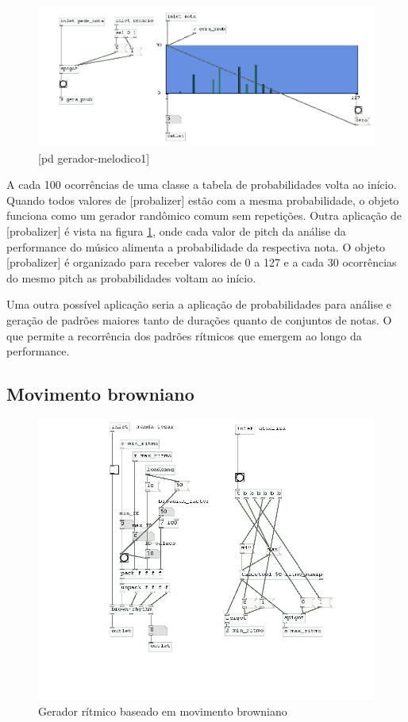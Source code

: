 \documentclass{ppgmus}
\begin{document}
\begin{figure}
\includegraphics[scale=.6]{gera-melodico1}
\caption{[pd gerador-melodico1]}
\label{gera-melodico1}
\end{figure}  

A cada 100 ocorrências de uma classe a tabela
de probabilidades volta ao início. Quando todos valores de [probalizer] estão
com a mesma probabilidade, o objeto funciona como um gerador randômico comum sem
repetições.
Outra aplicação de [probalizer] é vista na figura \ref{gera-melodico1},
onde cada valor de pitch da análise da performance do músico alimenta
a probabilidade da respectiva nota. O objeto [probalizer] é organizado
para receber valores de 0 a 127 e a cada 30 ocorrências do mesmo
pitch as probabilidades voltam ao início.


Uma outra possível aplicação seria a aplicação de probabilidades para
análise e geração de padrões maiores tanto de durações quanto de conjuntos
de notas. O que permite a recorrência dos padrões
rítmicos que emergem ao longo da performance.




\subsection{Movimento browniano}


\begin{figure}
\includegraphics[scale=.6]{gerador-ritmico2}
\caption{Gerador rítmico baseado em movimento browniano}
\label{gera-ritmico2}
\end{figure}  
\end{document}
